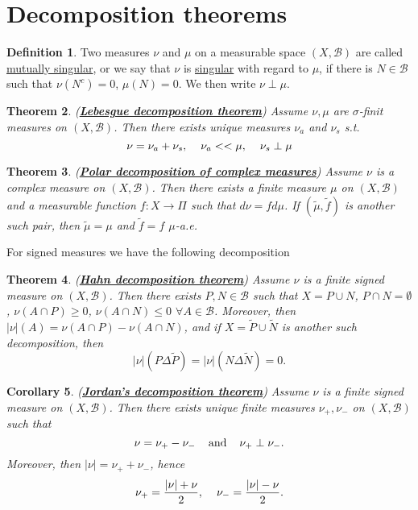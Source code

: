\documentclass{article}
\newtheorem{theorem}{Theorem}[section]
\newtheorem{corollary}[theorem]{Corollary}
\theoremstyle{definition}
\newtheorem{definition}[theorem]{Definition}
\newcommand{\B}{\mathscr{B}}
\begin{document}
\section{Decomposition theorems}
\begin{definition}
    Two measures $\nu$ and $\mu$ on a measurable space $(X,\B)$ are called \underline{mutually singular}, or we say that 
    $\nu$ is \underline{singular} with regard to $\mu$, if there is $N\in\B$ such that $\nu(N^c)=0$, $\mu(N)=0$. 
    We then write $\nu\perp\mu$.
\end{definition}

\begin{theorem}(\underline{\textbf{Lebesgue decomposition theorem}})
    Assume $\nu,\mu$ are $\sigma$-finit measures on $(X,\B)$. Then there exists unique measures 
    $\nu_a$ and $\nu_s$ s.t. $$\nu = \nu_a +\nu_s,\hspace{4mm} \nu_a<<\mu,\hspace{4mm} \nu_s\perp\mu$$
    
\end{theorem}

\begin{theorem}(\underline{\textbf{Polar decomposition of complex measures}})
    Assume $\nu$ is a complex measure on $(X,\B)$. Then there exists a finite measure $\mu$ on $(X,\B)$ and a measurable function 
    $f:X\rightarrow \Pi$ such that $d\nu = fd\mu$. If $(\tilde\mu,\tilde f)$ is another such pair, then $\tilde\mu=\mu$ and $\tilde f=f$ $\mu$-a.e.
\end{theorem}
For signed measures we have the following decomposition

\begin{theorem}(\underline{\textbf{Hahn decomposition theorem}})
    Assume $\nu$ is a finite signed measure on $(X,\B)$. Then there exists $P,N\in\B$ such that
    $X=P\cup N$, $P\cap N=\emptyset$, $\nu(A\cap P)\geq 0$, $\nu(A\cap N)\leq 0$ $\forall A\in \B$.
    Moreover, then $|\nu|(A) = \nu(A\cap P)-\nu(A\cap N)$, and if $X=\tilde P\cup \tilde N$ is another such decomposition, then 
    $$|\nu|(P\Delta \tilde P)=|\nu|(N\Delta \tilde N)=0.$$
\end{theorem}

\begin{corollary}(\underline{\textbf{Jordan's decomposition theorem}})
    Assume $\nu$ is a finite signed measure on $(X,\B)$. Then there exists unique finite measures $\nu_+,\nu_-$ on $(X,\B)$ such that 
    $$\nu = \nu_+ -\nu_-\hspace{4mm} \text{and}\hspace{4mm} \nu_+\perp\nu_-.$$
    Moreover, then $|\nu| = \nu_+ +\nu_-$, hence $$\nu_+ = \frac{|\nu|+\nu}{2},\hspace{4mm} \nu_-=\frac{|\nu|-\nu}{2}.$$
    
\end{corollary}
\end{document}
